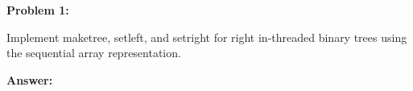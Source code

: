 \documentclass[10pt,letterpaper,final]{report}
\begin{document}
\begin{center}
  \vline
\end{center}

\medskip

\noindent\textbf{Problem 1:}
\medskip

Implement maketree, setleft, and setright for right in-threaded binary trees using the sequential array representation.

\medskip
\noindent\textbf{Answer:}
\medskip
\end{document}
